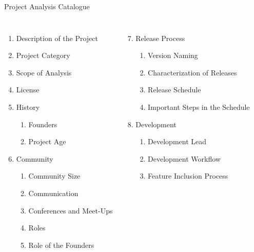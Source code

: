 \documentclass[11pt]{beamer}
\newlength{\colwidth}
\begin{document}
\begin{frame}{Project Analysis Catalogue}
  \begin{columns}[T]
  \column{\colwidth}
  \begin{enumerate}
    \item Description of the Project
    \item Project Category
    \item Scope of Analysis
    \item License
    \item History
    \begin{enumerate}
      \item Founders
      \item Project Age
    \end{enumerate}
    \item Community
    \begin{enumerate}
      \item Community Size
      \item Communication
      \item Conferences and Meet-Ups
      \item Roles
      \item Role of the Founders
    \end{enumerate}
  \end{enumerate}
  \column{\colwidth}
  \begin{enumerate}
    \setcounter{enumi}{6}
    \item Release Process
    \begin{enumerate}
      \item Version Naming
      \item Characterization of Releases
      \item Release Schedule
      \item Important Steps in the Schedule
    \end{enumerate}
    \item Development
    \begin{enumerate}
      \item Development Lead
      \item Development Workflow
      \item Feature Inclusion Process
    \end{enumerate}
  \end{enumerate}
  \end{columns}
\end{frame}
\end{document}

